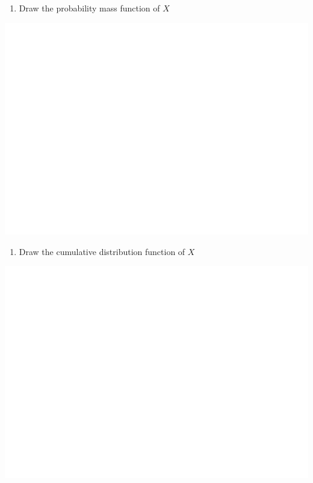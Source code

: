 \documentclass[]{book}
\providecommand{\tightlist}{%
  \setlength{\itemsep}{0pt}\setlength{\parskip}{0pt}}
\begin{document}
\begin{enumerate}
\def\labelenumi{\arabic{enumi}.}
\setcounter{enumi}{3}
\tightlist
\item
  Draw the probability mass function of \(X\)
\end{enumerate}

\begin{center}\includegraphics[width=1\linewidth]{figure/Ch1box11-1} \end{center}

\begin{enumerate}
\def\labelenumi{\arabic{enumi}.}
\setcounter{enumi}{4}
\tightlist
\item
  Draw the cumulative distribution function of \(X\)
\end{enumerate}

\begin{center}\includegraphics[width=1\linewidth]{figure/Ch1box12-1} \end{center}
\end{document}
